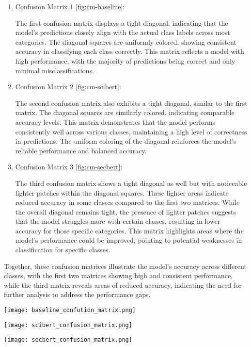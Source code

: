 \documentclass[11pt]{article}
\begin{document}
\begin{enumerate}
    \item Confusion Matrix 1 \ref{fig:cm-baseline}:

    The first confusion matrix displays a tight diagonal, indicating that the model's predictions closely align with the actual class labels across most categories. The diagonal squares are uniformly colored, showing consistent accuracy in classifying each class correctly. This matrix reflects a model with high performance, with the majority of predictions being correct and only minimal misclassifications.
    \item Confusion Matrix 2 \ref{fig:cm-scibert}:

    The second confusion matrix also exhibits a tight diagonal, similar to the first matrix. The diagonal squares are similarly colored, indicating comparable accuracy levels. This matrix demonstrates that the model performs consistently well across various classes, maintaining a high level of correctness in predictions. The uniform coloring of the diagonal reinforces the model's reliable performance and balanced accuracy.
    \item Confusion Matrix 3 \ref{fig:cm-secbert}:

    The third confusion matrix shows a tight diagonal as well but with noticeable lighter patches within the diagonal squares. These lighter areas indicate reduced accuracy in some classes compared to the first two matrices. While the overall diagonal remains tight, the presence of lighter patches suggests that the model struggles more with certain classes, resulting in lower accuracy for those specific categories. This matrix highlights areas where the model's performance could be improved, pointing to potential weaknesses in classification for specific classes.
\end{enumerate}

Together, these confusion matrices illustrate the model's accuracy across different classes, with the first two matrices showing high and consistent performance, while the third matrix reveals areas of reduced accuracy, indicating the need for further analysis to address the performance gaps.

\begin{figure*}[h]
    \centering
    \texttt{[image: baseline\_confution\_matrix.png]}
    \caption{BERT Confusion Matrix}
    \label{fig:cm-baseline}
\end{figure*}
\clearpage
\begin{figure*}[h]
    \centering
    \texttt{[image: scibert\_confusion\_matrix.png]}
    \caption{sciBERT Confusion Matrix}
    \label{fig:cm-scibert}
\end{figure*}
\clearpage
\begin{figure*}[h]
    \centering
    \texttt{[image: secbert\_confusion\_matrix.png]}
    \caption{secBERT Confusion Matrix}
    \label{fig:cm-secbert}
\end{figure*}
\end{document}
